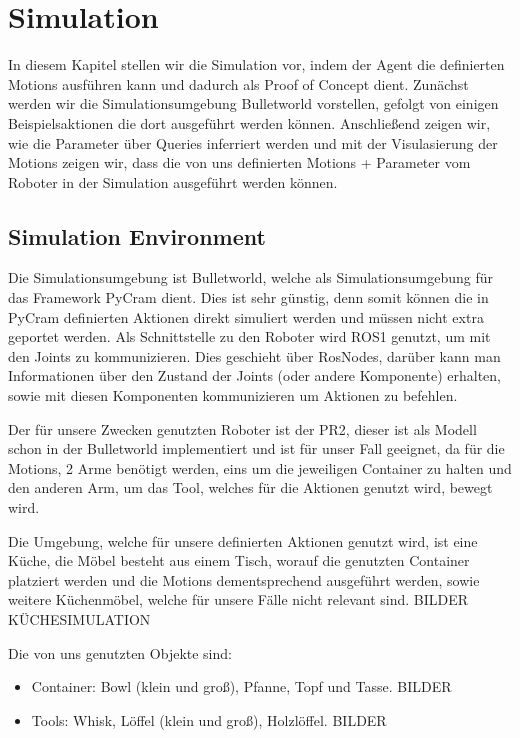 \chapter*{Simulation}

In diesem Kapitel stellen wir die Simulation vor, indem der Agent die definierten Motions ausführen kann und dadurch als Proof of Concept dient. 
Zunächst werden wir die Simulationsumgebung Bulletworld vorstellen, gefolgt von einigen Beispielsaktionen die dort ausgeführt werden können.
Anschließend zeigen wir, wie die Parameter über Queries inferriert werden und mit der Visulasierung der Motions zeigen wir, dass die von uns definierten Motions + Parameter vom Roboter in der Simulation ausgeführt werden können.

\section*{Simulation Environment}

Die Simulationsumgebung ist Bulletworld, welche als Simulationsumgebung für das Framework PyCram dient. Dies ist sehr günstig, denn somit können die in PyCram definierten Aktionen direkt simuliert werden und müssen nicht extra geportet werden. Als Schnittstelle zu den Roboter wird ROS1 genutzt, um mit den Joints zu kommunizieren. Dies geschieht über RosNodes, darüber kann man Informationen über den Zustand der Joints (oder andere Komponente) erhalten, sowie mit diesen Komponenten kommunizieren um Aktionen zu befehlen.

Der für unsere Zwecken genutzten Roboter ist der PR2, dieser ist als Modell schon in der Bulletworld implementiert und ist für unser Fall geeignet, da für die Motions, 2 Arme benötigt werden, eins um die jeweiligen Container zu halten und den anderen Arm, um das Tool, welches für die Aktionen genutzt wird, bewegt wird.

Die Umgebung, welche für unsere definierten Aktionen genutzt wird, ist eine Küche, die Möbel besteht aus einem Tisch, worauf die genutzten Container platziert werden und die Motions dementsprechend ausgeführt werden, sowie weitere Küchenmöbel, welche für unsere Fälle nicht relevant sind.
BILDER KÜCHESIMULATION

Die von uns genutzten Objekte sind:
\begin{itemize}
	\item Container: Bowl (klein und groß), Pfanne, Topf und Tasse. BILDER
	\item Tools: Whisk, Löffel (klein und groß), Holzlöffel. BILDER
\end{itemize}

